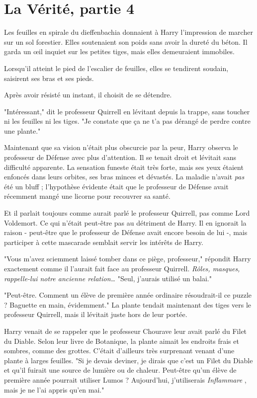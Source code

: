 
\chapter{La Vérité, partie 4}

Les feuilles en spirale du dieffenbachia donnaient à Harry l'impression de marcher sur un sol forestier. Elles soutenaient son poids sans avoir la dureté du béton. Il garda un œil inquiet sur les petites tiges, mais elles demeuraient immobiles.

Lorsqu'il atteint le pied de l'escalier de feuilles, elles se tendirent soudain, saisirent ses bras et ses pieds.

Après avoir résisté un instant, il choisit de se détendre.

"Intéressant," dit le professeur Quirrell en lévitant depuis la trappe, sans toucher ni les feuilles ni les tiges. "Je constate que ça ne t'a pas dérangé de perdre contre une plante."

Maintenant que sa vision n'était plus obscurcie par la peur, Harry observa le professeur de Défense avec plus d'attention. Il se tenait droit et lévitait sans difficulté apparente. La sensation funeste était très forte, mais ses yeux étaient enfoncés dans leurs orbites, ses bras minces et dévastés. La maladie n'avait \emph{pas}  été un bluff ; l'hypothèse évidente était que le professeur de Défense avait récemment mangé une licorne pour recouvrer sa santé.

Et il parlait toujours comme aurait parlé le professeur Quirrell, pas comme Lord Voldemort. Ce qui n'était peut-être pas au détriment de Harry. Il en ignorait la raison - peut-être que le professeur de Défense avait encore besoin de lui -, mais participer à cette mascarade semblait servir les intérêts de Harry.

"Vous m'avez sciemment laissé tomber dans ce piège, professeur," répondit Harry exactement comme il l'aurait fait face au professeur Quirrell. \emph{Rôles, masques, rappelle-lui notre ancienne relation…}  "Seul, j'aurais utilisé un balai."

"Peut-être. Comment un élève de première année ordinaire résoudrait-il ce puzzle ? Baguette en main, évidemment." La plante tendait maintenant des tiges vers le professeur Quirrell, mais il lévitait juste hors de leur portée.

Harry venait de se rappeler que le professeur Chourave leur avait parlé du Filet du Diable. Selon leur livre de Botanique, la plante aimait les endroits frais et sombres, comme des grottes. C'était d'ailleurs très surprenant venant d'une plante à larges feuilles. "Si je devais deviner, je dirais que c'est un Filet du Diable et qu'il fuirait une source de lumière ou de chaleur. Peut-être qu'un élève de première année pourrait utiliser Lumos ? Aujourd'hui, j'utiliserais \emph{Inflammare} , mais je ne l'ai appris qu'en mai."

